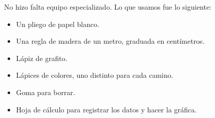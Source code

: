 No hizo falta equipo especializado. Lo que usamos fue lo siguiente:
\begin{itemize}
\item Un pliego de papel blanco.
\item Una regla de madera de un metro, graduada en centímetros.
\item Lápiz de grafito.
\item Lápices de colores, uno distinto para cada camino.
\item Goma para borrar.
\item Hoja de cálculo para registrar los datos y hacer la gráfica.
\end{itemize}
